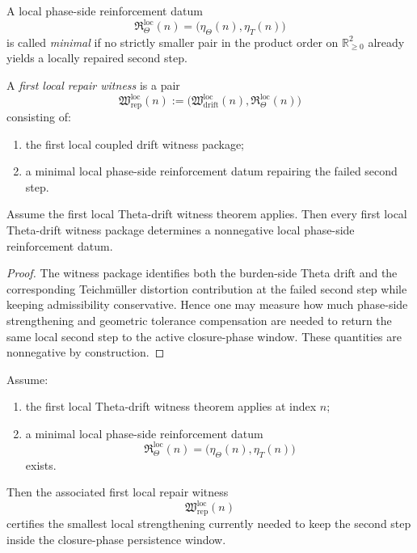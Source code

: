 \begin{definition}
\label{def:minimal-local-phase-side-reinforcement}
A local phase-side reinforcement datum
\[
\mathfrak{R}_{\Theta}^{\mathrm{loc}}(n)
=
\bigl(
\eta_{\Theta}(n),
\eta_{T}(n)
\bigr)
\]
is called \emph{minimal} if no strictly smaller pair in the product order on $\mathbb{R}_{\ge 0}^{2}$ already yields a locally repaired second step.
\end{definition}

\begin{definition}
\label{def:first-local-repair-witness}
A \emph{first local repair witness} is a pair
\[
\mathfrak{W}_{\mathrm{rep}}^{\mathrm{loc}}(n)
:=
\bigl(
\mathfrak{W}_{\mathrm{drift}}^{\mathrm{loc}}(n),
\mathfrak{R}_{\Theta}^{\mathrm{loc}}(n)
\bigr)
\]
consisting of:
\begin{enumerate}
 \item the first local coupled drift witness package;
 \item a minimal local phase-side reinforcement datum repairing the failed second step.
\end{enumerate}
\end{definition}

\begin{proposition}
\label{prop:theta-drift-witnesses-induce-local-repair-data}
Assume the first local Theta-drift witness theorem applies.
Then every first local Theta-drift witness package determines a nonnegative local phase-side reinforcement datum.
\end{proposition}

\begin{proof}
The witness package identifies both the burden-side Theta drift and the corresponding Teichm\"uller distortion contribution at the failed second step while keeping admissibility conservative.
Hence one may measure how much phase-side strengthening and geometric tolerance compensation are needed to return the same local second step to the active closure-phase window.
These quantities are nonnegative by construction.
\end{proof}

\begin{lemma}
\label{lem:first-local-repair-lemma}
Assume:
\begin{enumerate}
 \item the first local Theta-drift witness theorem applies at index $n$;
 \item a minimal local phase-side reinforcement datum
 \[
 \mathfrak{R}_{\Theta}^{\mathrm{loc}}(n)
 =
 \bigl(
 \eta_{\Theta}(n),
 \eta_{T}(n)
 \bigr)
 \]
 exists.
\end{enumerate}
Then the associated first local repair witness
\[
\mathfrak{W}_{\mathrm{rep}}^{\mathrm{loc}}(n)
\]
certifies the smallest local strengthening currently needed to keep the second step inside the closure-phase persistence window.
\end{lemma}

